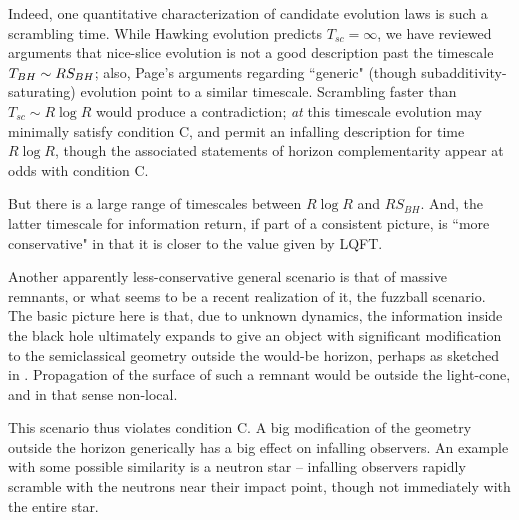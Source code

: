 Indeed, one quantitative characterization of candidate evolution laws is such a scrambling time.  While Hawking evolution predicts $T_{sc}=\infty$,  we have reviewed arguments that nice-slice evolution is not a good description past the timescale ${T_{BH}}\sim R S_{BH}$; also, Page's arguments regarding ``generic" (though subadditivity-saturating) evolution point to a similar timescale.  Scrambling faster than $T_{sc}\sim R\log R$ would produce a contradiction; {\it at} this  timescale evolution may minimally satisfy condition C, and permit an infalling description for time $R\log R$, though the associated statements of horizon complementarity appear at odds with condition C.


 But there is a large range of  timescales between $R\log R$ and $R S_{BH}$.  And, the latter  timescale for information return, if part of a consistent picture, is ``more conservative" in that it is closer to the value given by LQFT.



Another apparently less-conservative general scenario is that of massive remnants, or what seems to be a recent realization of it, the fuzzball scenario.  The basic picture here is that, due to unknown dynamics, the information inside the black hole ultimately expands to give an object with significant modification to the semiclassical geometry outside the would-be horizon, perhaps as sketched in \MRevol.  Propagation of the surface of such a remnant would be outside the light-cone, and in that sense non-local.  

This scenario thus violates condition C.  A big modification of the geometry outside the horizon generically has a big effect on infalling observers.  An example with some possible similarity is a neutron star -- infalling observers rapidly scramble with the neutrons near their impact point, though not immediately with the entire star.

